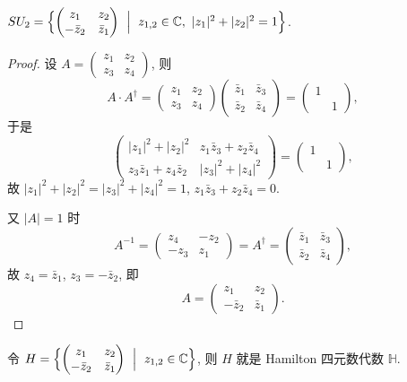 \begin{proposition}\label{prop:SU2-form}
$SU_2=\Bigl\{\begin{pmatrix}z_1&z_2\\-\bar z_2&\bar z_1\end{pmatrix}\ \Bigm|\ z_{1,2}\in\mathbb{C},\
|z_1|^2+|z_2|^2=1\Bigr\}$.
\end{proposition}

\begin{proof}
设 $A=\begin{pmatrix}z_1&z_2\\z_3&z_4\end{pmatrix}$, 则
\[
  A\cdot A^{\dagger}=\begin{pmatrix}z_1&z_2\\z_3&z_4\end{pmatrix}
  \begin{pmatrix}\bar z_1&\bar z_3\\ \bar z_2&\bar z_4\end{pmatrix}
  =\begin{pmatrix}1&\\&1\end{pmatrix},
\]
于是
\[
  \begin{pmatrix}|z_1|^2+|z_2|^2 & z_1\bar z_3+z_2\bar z_4\\
  z_3\bar z_1+z_4\bar z_2 & |z_3|^2+|z_4|^2\end{pmatrix}=\begin{pmatrix}1&\\&1\end{pmatrix},
\]
故 $|z_1|^2+|z_2|^2=|z_3|^2+|z_4|^2=1$, $z_1\bar z_3+z_2\bar z_4=0$.

又 $|A|=1$ 时
\[
  A^{-1}=\begin{pmatrix}z_4&-z_2\\-z_3&z_1\end{pmatrix}
  =A^{\dagger}=\begin{pmatrix}\bar z_1&\bar z_3\\ \bar z_2&\bar z_4\end{pmatrix},
\]
故 $z_4=\bar z_1$, $z_3=-\bar z_2$, 即
\[
  A=\begin{pmatrix}z_1&z_2\\-\bar z_2&\bar z_1\end{pmatrix}.
\]
\end{proof}

\begin{remark}\label{rem:quaternion-subgroup}
令 $H=\Bigl\{\begin{pmatrix}z_1&z_2\\-\bar z_2&\bar z_1\end{pmatrix}\ \Bigm|\ z_{1,2}\in\mathbb{C}\Bigr\}$,
则 $H$ 就是 Hamilton 四元数代数 $\mathbb{H}$.
\end{remark}

